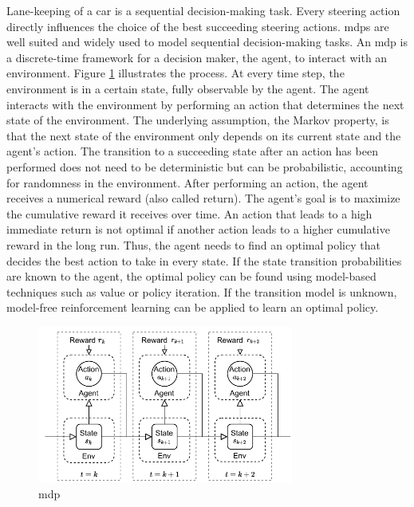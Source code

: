 Lane-keeping of a car is a sequential decision-making task. Every steering action directly influences the choice of the best succeeding steering actions. \Glspl{mdp} are well suited and widely used to model sequential decision-making tasks. An \gls{mdp} is a discrete-time framework for a decision maker, the agent, to interact with an environment. Figure \ref{fig:mdp} illustrates the process. At every time step, the environment is in a certain state, fully observable by the agent. The agent interacts with the environment by performing an action that determines the next state of the environment. The underlying assumption, the Markov property, is that the next state of the environment only depends on its current state and the agent's action. The transition to a succeeding state after an action has been performed does not need to be deterministic but can be probabilistic, accounting for randomness in the environment. After performing an action, the agent receives a numerical reward (also called return). The agent's goal is to maximize the cumulative reward it receives over time. An action that leads to a high immediate return is not optimal if another action leads to a higher cumulative reward in the long run. Thus, the agent needs to find an optimal policy that decides the best action to take in every state. If the state transition probabilities are known to the agent, the optimal policy can be found using model-based techniques such as value or policy iteration. If the transition model is unknown, model-free reinforcement learning can be applied to learn an optimal policy.

\begin{figure}[htbp]
    \centering
    \includegraphics[width=0.75\textwidth]{figures/MDP.pdf}
    \caption{\acrfull{mdp}}
    \label{fig:mdp}
\end{figure}

